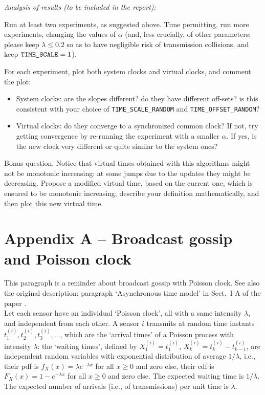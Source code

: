 \documentclass{article}
\begin{document}
{\itshape \color{blue} Analysis of results (to be included in the report):

Run at least two experiments, as suggested above.
Time permitting, run more experiments, changing the values of $\alpha$
(and, less crucially, of other parameters; please keep  $\lambda \le 0.2$ so as to have negligible risk of transmission collisions, and keep
$\verb=TIME_SCALE= = 1$).

For each experiment, plot both system clocks and virtual clocks, and comment the plot:
\begin{itemize}
	\item System clocks: are the slopes different? do they have different off-sets? is this consistent with your choice of \verb=TIME_SCALE_RANDOM= and \verb=TIME_OFFSET_RANDOM=?
	\item Virtual clocks: do they converge to a synchronized common clock? If not, try getting convergence by re-running the experiment with a smaller $\alpha$. If yes, is the new clock very different or quite similar to the system ones?
\end{itemize}
Bonus question. Notice that virtual times obtained with this algorithms might not be monotonic increasing: at some jumps due to the updates they might be decreasing. Propose a modified virtual time, based on the current one, which is ensured to be monotonic increasing; describe your definition mathematically, and then plot this new virtual time.
} %

\newpage
\section*{Appendix A -- Broadcast gossip and Poisson clock}
This paragraph is a reminder about broadcast gossip with Poisson clock. See also the original description: paragraph `Asynchronous time model' in Sect.~I-A of the paper \cite{gossip-poisson}.\\

Let each sensor have an individual `Poisson clock', all with a same intensity $\lambda$, and independent from each other. A sensor $i$ transmits at random time instants $t_1^{(i)}, t_2^{(i)}, t_3^{(i)}, \dots$, which are the `arrival times' of a Poisson process with intensity $\lambda$: the `waiting times', defined by $X_1^{(i)} = t_1^{(i)}$, $X_k^{(i)} = t_k^{(i)}-t_{k-1}^{(i)}$, are independent random variables with exponential distribution of average $1/\lambda$, i.e., their pdf is $f_X(x) = \lambda e^{-\lambda x}$ for all $x \ge 0$ and zero else, their cdf is $F_X(x) = 1 - e^{-\lambda x} $ for all $x \ge 0$ and zero else. The expected waiting time is $1/\lambda$. The expected number of arrivals (i.e., of transmissions) per unit time is $\lambda$.\\
\end{document}
